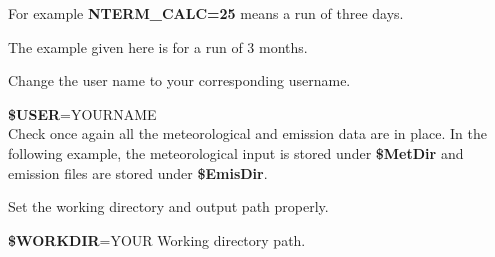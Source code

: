 For example \textbf{NTERM\_CALC=25} means a run of three days. 

 The example given here is for a run of 3 months.  

 Change
the user name to your corresponding username. 

\textbf{\$USER}=YOURNAME \\

Check once again all the meteorological and emission data are in
place. In the following example, the meteorological input is stored
under \textbf{\$MetDir} and emission files are stored under
\textbf{\$EmisDir}.  

 Set the working directory and output path properly.

\textbf{\$WORKDIR}=YOUR Working directory path.\\




